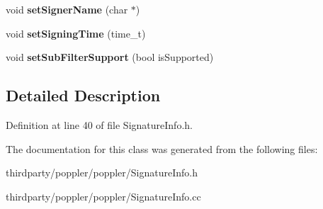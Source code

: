\begin{DoxyCompactItemize}
\item 
\mbox{\label{class_signature_info_aad42bd01a01074866f0faf18481e0537}} 
void {\bfseries set\+Signer\+Name} (char $\ast$)
\item 
\mbox{\label{class_signature_info_a8d1c26e75f2ad3fe2b177150d8629c9d}} 
void {\bfseries set\+Signing\+Time} (time\+\_\+t)
\item 
\mbox{\label{class_signature_info_a10e674548e89233802f97c4cff65c494}} 
void {\bfseries set\+Sub\+Filter\+Support} (bool is\+Supported)
\end{DoxyCompactItemize}


\subsection{Detailed Description}


Definition at line 40 of file Signature\+Info.\+h.



The documentation for this class was generated from the following files\+:\begin{DoxyCompactItemize}
\item 
thirdparty/poppler/poppler/Signature\+Info.\+h\item 
thirdparty/poppler/poppler/Signature\+Info.\+cc\end{DoxyCompactItemize}
